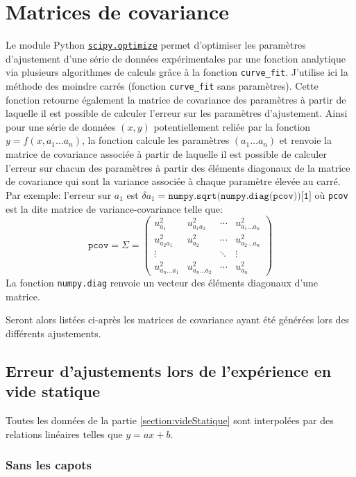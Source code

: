\chapter{Matrices de covariance}
\label{chapter:MatricesDeCovariance}
Le module Python \texttt{\href{https://docs.scipy.org/doc/scipy/reference/optimize.html}{scipy.optimize}} permet d'optimiser les paramètres d'ajustement d'une série de données expérimentales par une fonction analytique via plusieurs algorithmes de calculs grâce à la fonction \texttt{curve\_fit}. J'utilise ici la méthode des moindre carrés (fonction \texttt{curve\_fit} sans paramètres). Cette fonction retourne également la matrice de covariance des paramètres à partir de laquelle il est possible de calculer l'erreur sur les paramètres d'ajustement. Ainsi pour une série de données $(x,y)$ potentiellement reliée par la fonction $y = f(x, a_1 \dots a_n)$, la fonction calcule les paramètres $(a_1 \dots a_n)$ et renvoie la matrice de covariance associée à partir de laquelle il est possible de calculer l'erreur sur chacun des paramètres à partir des éléments diagonaux de la matrice de covariance qui sont la variance associée à chaque paramètre élevée au carré. Par exemple: l'erreur sur $a_1$ est $\delta a_1 = \texttt{numpy.sqrt(numpy.diag(pcov))[1]}$ où \texttt{pcov} est la dite matrice de variance-covariance telle que:
\[\texttt{pcov} = \Sigma = \left( \begin{matrix}u_{a_1}^2 & u_{a_1a_2}^2 & \cdots & u_{a_1\dots a_n}^2 \\ u_{a_2a_1}^2 & u_{a_2}^2 & \cdots & u_{a_2\dots a_n}^2 \\ \vdots & & \ddots & \vdots \\ u_{a_n\dots a_1}^2 & u_{a_n\dots a_2}^2 & \cdots & u_{a_n}^2 \end{matrix}\right)\]
La fonction \texttt{numpy.diag} renvoie un vecteur des éléments diagonaux d'une matrice.

Seront alors listées ci-après les matrices de covariance ayant été générées lors des différents ajustements.

\section{Erreur d'ajustements lors de l'expérience en vide statique}
Toutes les données de la partie \ref{section:videStatique} sont interpolées par des relations linéaires telles que $y = ax + b$.

\subsection{Sans les capots}
